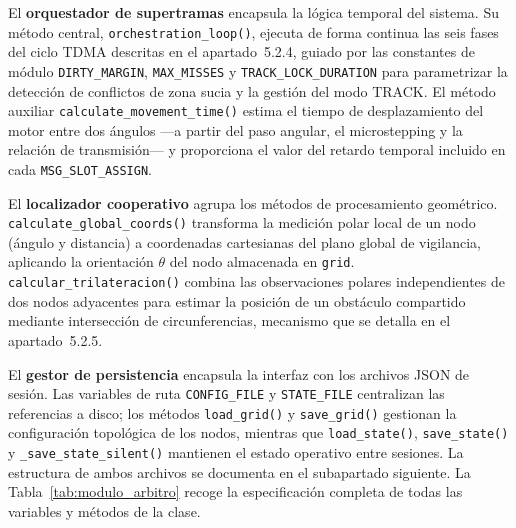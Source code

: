 El \textbf{orquestador de supertramas} encapsula la lógica temporal del sistema. Su método central, \texttt{orchestration\_loop()}, ejecuta de forma continua las seis fases del ciclo TDMA descritas en el apartado~5.2.4, guiado por las constantes de módulo \texttt{DIRTY\_MARGIN}, \texttt{MAX\_MISSES} y \texttt{TRACK\_LOCK\_DURATION} para parametrizar la detección de conflictos de zona sucia y la gestión del modo TRACK. El método auxiliar \texttt{calculate\_movement\_time()} estima el tiempo de desplazamiento del motor entre dos ángulos ---a partir del paso angular, el microstepping y la relación de transmisión--- y proporciona el valor del retardo temporal incluido en cada \texttt{MSG\_SLOT\_ASSIGN}.

El \textbf{localizador cooperativo} agrupa los métodos de procesamiento geométrico. \texttt{calculate\_global\_coords()} transforma la medición polar local de un nodo (ángulo y distancia) a coordenadas cartesianas del plano global de vigilancia, aplicando la orientación $\theta$ del nodo almacenada en \texttt{grid}. \texttt{calcular\_trilateracion()} combina las observaciones polares independientes de dos nodos adyacentes para estimar la posición de un obstáculo compartido mediante intersección de circunferencias, mecanismo que se detalla en el apartado~5.2.5.

El \textbf{gestor de persistencia} encapsula la interfaz con los archivos JSON de sesión. Las variables de ruta \texttt{CONFIG\_FILE} y \texttt{STATE\_FILE} centralizan las referencias a disco; los métodos \texttt{load\_grid()} y \texttt{save\_grid()} gestionan la configuración topológica de los nodos, mientras que \texttt{load\_state()}, \texttt{save\_state()} y \texttt{\_save\_state\_silent()} mantienen el estado operativo entre sesiones. La estructura de ambos archivos se documenta en el subapartado siguiente. La Tabla~\ref{tab:modulo_arbitro} recoge la especificación completa de todas las variables y métodos de la clase.


